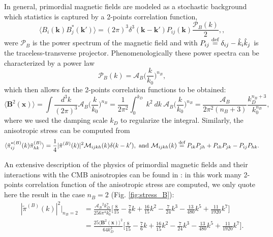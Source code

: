 In general, primordial magnetic fields are modeled as a stochastic background which statistics is captured by a 2-points correlation function,
\begin{equation}
    \langle B_i(\mathbf{k})B^*_j(\mathbf{k'})\rangle=(2\pi)^3\delta^3(\mathbf{k}-\mathbf{k'})P_{ij}(\mathbf{k})\frac{\mathcal P_B(k)}{2},\label{eq:magnetic_2pt},
\end{equation}
were $\mathcal P_B$ is the power spectrum of the magnetic field and with $P_{ij}\stackrel{\text{def}}{=} \delta_{ij} - \hat k_i\hat k_j$ is the traceless-transverse projector.  Phenomenologically these power spectra can be characterized by a power law
$$\mathcal{P}_B(k)=\mathcal A_B\bigg(\frac{k}{k_0}\bigg)^{n_B},$$
which then allows for the 2-points correlation functions to be obtained:
$$\big\langle \mathbf B^2(\mathbf{x})\big\rangle=\int \frac{d^3k}{(2\pi)^3}\mathcal A_B\bigg(\frac{k}{k_0}\bigg)^{n_B}=\frac{1}{2\pi^2}\int_0^{k_D}\ k^2\ dk\ \mathcal A_B\bigg(\frac{k}{k_0}\bigg)^{n_B}=\frac{\mathcal{A}_B }{2\pi^2(n_B+3)}\frac{k_D^{n_B+3}}{k_0^{n_B}},$$
where we used the damping scale $k_D$ to regularize the integral. Similarly, the anisotropic stress can be computed from
$$\langle\tilde\pi^{*(B)}_{ij}(k)\tilde\pi^{(B)}_{hk}\rangle=\frac{1}{4}|\tilde \pi^{(B)}(k)|^2\mathcal{M}_{ijkh}(k)\delta(k-k'),\text{ and }\mathcal{M}_{ijkh}(k)\stackrel{\text{def}}{=} P_{ik}P_{jh}+P_{ih}P_{jk}-P_{ij}P_{hk}.$$

An extensive description of the physics of primordial magnetic fields and their interactions with the CMB anisotropies can be found in \cite{Paoletti_2009}: in this work many 2-points correlation function of the anisotropic stress are computed, we only quote here the result in the case $n_B=2$ (Fig. \ref{fig:stress_B}):
\begin{align*}
    |\tilde \pi^{(B)}(k)|^2\bigg|_{n_B=2}&=\frac{\mathcal{A_B}^2k_D^7}{256\pi^4k_0 ^4}\bigg[\frac{8}{15}-\frac{7}{6}k+\frac{16}{15}k^2-\frac{7}{24}k^3-\frac{13}{480}k^5+\frac{11}{1920}k^7\bigg]\\
    &=\frac{25\big\langle \mathbf B^2(\mathbf{x})\big\rangle^2}{64k_D^3}\bigg[\frac{8}{15}-\frac{7}{6}k+\frac{16}{15}k^2-\frac{7}{24}k^3-\frac{13}{480}k^5+\frac{11}{1920}k^7\bigg].
\end{align*}




